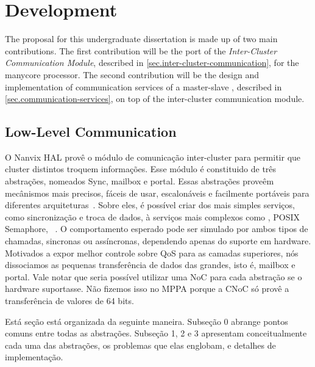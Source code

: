 \chapter{Development}
\label{ch.development}


	The proposal for this undergraduate dissertation is made up of two main contributions.
	The first contribution will be the port of the \textit{Inter-Cluster Communication Module},
	described in \autoref{sec.inter-cluster-communication}, for the \mppa manycore processor.
	The second contribution will be the design and implementation of communication services
	of a master-slave \os, described in \autoref{sec.communication-services}, on top of
	the inter-cluster communication module.


	\section{Low-Level Communication}
	\label{sec.low-level-comm}

		O Nanvix HAL provê o módulo de comunicação inter-cluster para permitir que cluster distintos troquem informações.
		Esse módulo é constituido de três abstrações, nomeados Sync, mailbox e portal.
		Essas abstrações proveêm mecânismos mais precisos, fáceis de usar, escalonáveis e facilmente portáveis para diferentes arquiteturas~\cite{wentzlaff_fleets:_2011}.
		Sobre eles, é possível criar dos mais simples serviços, como sincronização e troca de dados, à serviços mais complexos como \shm, POSIX Semaphore, \rmem~\cite{penna:rmen}.
		O comportamento esperado pode ser simulado por ambos tipos de chamadas, sincronas ou assíncronas, dependendo apenas do suporte em hardware.
		Motivados a expor melhor controle sobre QoS para as camadas superiores, nós dissociamos as pequenas transferência de dados das grandes, isto é, mailbox e portal.
		Vale notar que seria possível utilizar uma NoC para cada abstração se o hardware suportasse.
		Não fizemos isso no MPPA porque a CNoC só provê a transferência de valores de 64 bits.

		Está seção está organizada da seguinte maneira.
		Subseção 0 abrange pontos comuns entre todas as abstrações.
		Subseção 1, 2 e 3 apresentam conceitualmente cada uma das abstrações, os problemas que elas englobam, e detalhes de implementação.

